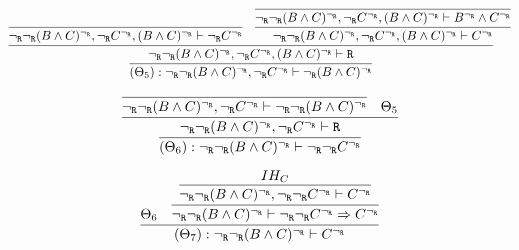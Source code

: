 \begin{enumerate}[(i)]
\begin{itemize}
            $$
            \infer{
                            (\Theta_5) : \ngr\ngr(B \wedge C)^\ngr, \ngr C^\ngr \vdash \ngr(B \wedge C)^\ngr
                        }{
                            \infer{
                                \ngr\ngr(B \wedge C)^\ngr, \ngr C^\ngr, (B \wedge C)^\ngr \vdash \R
                            }{
                                \infer{
                                    \ngr\ngr(B \wedge C)^\ngr, \ngr C^\ngr, (B \wedge C)^\ngr \vdash \ngr C^\ngr
                                }{
                                }&
                                \infer{
                                    \ngr\ngr(B \wedge C)^\ngr, \ngr C^\ngr, (B \wedge C)^\ngr \vdash C^\ngr
                                }{
                                    \infer{
                                        \ngr\ngr(B \wedge C)^\ngr, \ngr C^\ngr, (B \wedge C)^\ngr \vdash B^\ngr \wedge C^\ngr
                                    }{
                                    }
                                }
                            }
                        }
            $$        
        
            $$
            \infer{
                    (\Theta_6) : \ngr\ngr(B \wedge C)^\ngr \vdash \ngr\ngr C^\ngr
                }{
                    \infer{
                        \ngr\ngr(B \wedge C)^\ngr, \ngr C^\ngr \vdash \R
                    }{
                        \infer{
                            \ngr\ngr(B \wedge C)^\ngr, \ngr C^\ngr \vdash \ngr\ngr(B \wedge C)^\ngr
                        }{
                        }&
                        \Theta_5
                    }
                }
            $$        
        
            $$
            \infer{
                (\Theta_7) : \ngr\ngr(B \wedge C)^\ngr \vdash C^\ngr
            }{
                \Theta_6
                &
                \infer{
                    \ngr\ngr(B \wedge C)^\ngr \vdash \ngr\ngr C^\ngr \Rightarrow  C^\ngr
                }{
                    \infer{
                        \ngr\ngr(B \wedge C)^\ngr, \ngr\ngr C^\ngr \vdash  C^\ngr
                    }{
                        IH_C
                    }
                }
            }
            $$
            

\end{itemize}
\end{enumerate}
